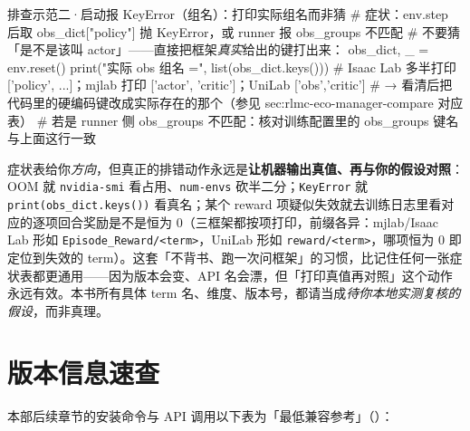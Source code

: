 \begin{codebox}[Python]{排查示范二·启动报 KeyError（组名）：打印实际组名而非猜}
# 症状：env.step 后取 obs_dict["policy"] 抛 KeyError，或 runner 报 obs_groups 不匹配
# 不要猜「是不是该叫 actor」——直接把框架\emph{真实}给出的键打出来：
obs_dict, _ = env.reset()
print("实际 obs 组名 =", list(obs_dict.keys()))
#  Isaac Lab 多半打印 ['policy', ...]；mjlab 打印 ['actor', 'critic']；UniLab ['obs','critic']
#  → 看清后把代码里的硬编码键改成实际存在的那个（参见 sec:rlmc-eco-manager-compare 对应表）
#  若是 runner 侧 obs_groups 不匹配：核对训练配置里的 obs_groups 键名与上面这行一致
\end{codebox}

\begin{insight}\label{ins:rlmc-eco-debugmethod}
症状表给你\emph{方向}，但真正的排错动作永远是\textbf{让机器输出真值、再与你的假设对照}：OOM 就 \verb|nvidia-smi| 看占用、\verb|num-envs| 砍半二分；\verb|KeyError| 就 \verb|print(obs_dict.keys())| 看真名；某个 reward 项疑似失效就去训练日志里看对应的逐项回合奖励是不是恒为 0（三框架都按项打印，前缀各异：mjlab/Isaac Lab 形如 \verb|Episode_Reward/<term>|，UniLab 形如 \verb|reward/<term>|，哪项恒为 0 即定位到失效的 term）。这套「不背书、跑一次问框架」的习惯，比记住任何一张症状表都更通用——因为版本会变、API 名会漂，但「打印真值再对照」这个动作永远有效。本书所有具体 term 名、维度、版本号，都请当成\emph{待你本地实测复核的假设}，而非真理。
\end{insight}

\section*{版本信息速查}
\label{sec:rlmc-eco-version}

本部后续章节的安装命令与 API 调用以下表为「最低兼容参考」（）：

